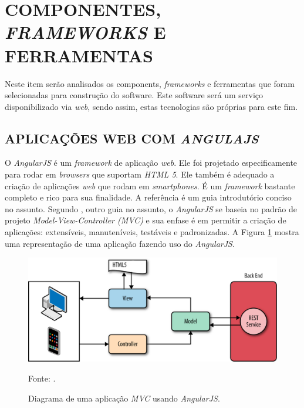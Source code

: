 \section[COMPONENTES, FRAMEWORKS E FERRAMENTAS]{COMPONENTES, \emph{FRAMEWORKS} E FERRAMENTAS}
Neste item serão analisados os components, \emph{frameworks} e ferramentas que foram selecionadas para construção do software. 
Este software será um serviço disponibilizado via \emph{web}, sendo assim, estas tecnologias são próprias para este fim. 

\subsection{APLICAÇÕES WEB COM \emph{ANGULAJS}}
\label{angularjs}
O \emph{AngularJS} é um \emph{framework} de aplicação \emph{web}. 
Ele foi projetado especificamente para rodar em \emph{browsers} que suportam \emph{HTML 5}.
Ele também é adequado a criação de aplicações \emph{web} que rodam em \emph{smartphones}. 
É um \emph{framework} bastante completo e rico para sua finalidade. 
A referência  é um guia introdutório conciso no assunto.
 Segundo , outro guia no assunto, o \emph{AngularJS} se baseia no padrão de projeto \emph{Model-View-Controller (MVC)} e sua enfase é em permitir a criação de aplicações: extensíveis, manuteníveis, testáveis e padronizadas. 
A Figura \ref{angularjs_mvc} mostra uma representação de uma aplicação fazendo uso do \emph{AngularJS}.

\begin{figure}[ht]
	\centering
	\includegraphics[width=14cm]{figuras/angulajs_mvc.eps}
	\caption{Diagrama de uma aplicação \emph{MVC} usando \emph{AngularJS}.}
	\label{angularjs_mvc}
	\footnotesize Fonte: .
\end{figure}

